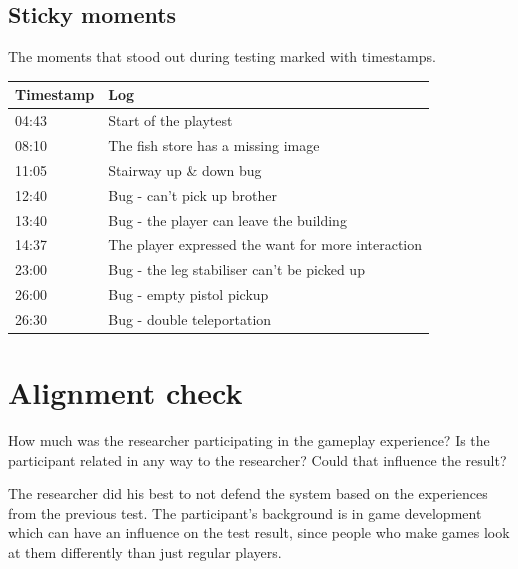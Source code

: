 \subsection{Sticky moments}
The moments that stood out during testing marked with timestamps.
\begin{table}[h]
\centering
\begin{tabular}{|p{3cm}|p{10cm}|}
\hline
\textbf{Timestamp} & \textbf{Log} \\ \hline
04:43 & Start of the playtest \\ \hline 
08:10 & The fish store has a missing image \\ \hline 
11:05 & Stairway up \& down bug \\ \hline 
12:40 & Bug - can't pick up brother \\ \hline 
13:40 & Bug - the player can leave the building \\ \hline 
14:37 & The player expressed the want for more interaction \\ \hline 
23:00 & Bug - the leg stabiliser can't be picked up \\ \hline 
26:00 & Bug - empty pistol pickup \\ \hline 
26:30 & Bug - double teleportation \\ \hline 



\end{tabular}
\end{table}

\section{Alignment check}
How much was the researcher participating in the gameplay experience? 
Is the participant related in any way to the researcher? Could that influence the result?

The researcher did his best to not defend the system based on the experiences from the previous test. The participant's background is in game development which can have an influence on the test result, since people who make games look at them differently than just regular players.
